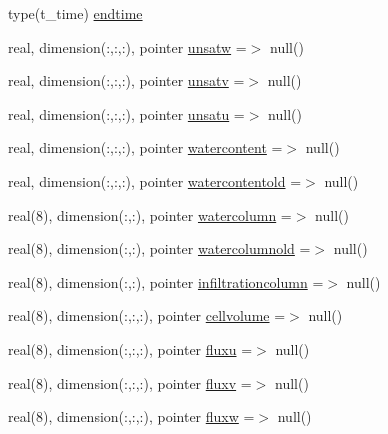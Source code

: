 \begin{DoxyCompactItemize}
\item 
type(t\+\_\+time) \mbox{\hyperlink{structmoduleporousmediaproperties_1_1t__extvar_aecc010d9421d55f6ae1780608187d8a8}{endtime}}
\item 
real, dimension(\+:,\+:,\+:), pointer \mbox{\hyperlink{structmoduleporousmediaproperties_1_1t__extvar_a2db107a0a267c926b9e5820760121d63}{unsatw}} =$>$ null()
\item 
real, dimension(\+:,\+:,\+:), pointer \mbox{\hyperlink{structmoduleporousmediaproperties_1_1t__extvar_a8a3e9d1d3d4664ee5803e2068e913290}{unsatv}} =$>$ null()
\item 
real, dimension(\+:,\+:,\+:), pointer \mbox{\hyperlink{structmoduleporousmediaproperties_1_1t__extvar_ab3ddd21dc7403adcf34b9b2c3692b61b}{unsatu}} =$>$ null()
\item 
real, dimension(\+:,\+:,\+:), pointer \mbox{\hyperlink{structmoduleporousmediaproperties_1_1t__extvar_a199563d6fd3f3e028d6282a3758220e4}{watercontent}} =$>$ null()
\item 
real, dimension(\+:,\+:,\+:), pointer \mbox{\hyperlink{structmoduleporousmediaproperties_1_1t__extvar_ad847aa7ca3f328525958c11494640633}{watercontentold}} =$>$ null()
\item 
real(8), dimension(\+:,\+:), pointer \mbox{\hyperlink{structmoduleporousmediaproperties_1_1t__extvar_a659f39b55bbfd79cabceaf3f8e55a0bd}{watercolumn}} =$>$ null()
\item 
real(8), dimension(\+:,\+:), pointer \mbox{\hyperlink{structmoduleporousmediaproperties_1_1t__extvar_adbf991f38e547bc4189828ba09f00b2e}{watercolumnold}} =$>$ null()
\item 
real(8), dimension(\+:,\+:), pointer \mbox{\hyperlink{structmoduleporousmediaproperties_1_1t__extvar_ac9c9aa25ff65a4b115463ed75cd07694}{infiltrationcolumn}} =$>$ null()
\item 
real(8), dimension(\+:,\+:,\+:), pointer \mbox{\hyperlink{structmoduleporousmediaproperties_1_1t__extvar_afda201780add5438aa893eb79c8c7acf}{cellvolume}} =$>$ null()
\item 
real(8), dimension(\+:,\+:,\+:), pointer \mbox{\hyperlink{structmoduleporousmediaproperties_1_1t__extvar_a6d161ca04722702d9f8daa112d6134c7}{fluxu}} =$>$ null()
\item 
real(8), dimension(\+:,\+:,\+:), pointer \mbox{\hyperlink{structmoduleporousmediaproperties_1_1t__extvar_a6a5172017c12bb2003e7f12ca8edcf73}{fluxv}} =$>$ null()
\item 
real(8), dimension(\+:,\+:,\+:), pointer \mbox{\hyperlink{structmoduleporousmediaproperties_1_1t__extvar_ac7cd92de8954707821b8355d93a76f5b}{fluxw}} =$>$ null()

\end{DoxyCompactItemize}
